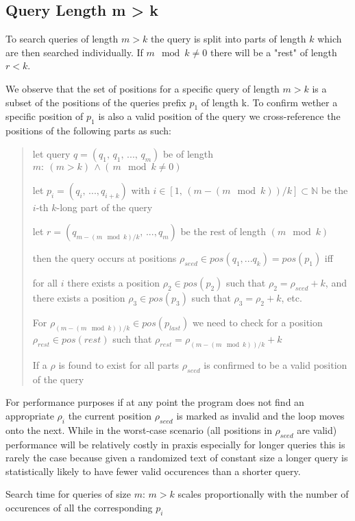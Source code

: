\subsection{Query Length m > k}
\label{m > k}

To search queries of length $m>k$ the query is split into parts of length $k$ which are then searched individually.
If $m\mod k\neq0$ there will be a "rest" of length $r<k$.

We observe that the set of positions for a specific query of length $m>k$ is a subset of the positions of the queries
prefix $p_{1}$ of length k. To confirm wether a specific position of $p_{1}$ is also a valid position of the query we
cross-reference the positions of the following parts as such:

\begin{verse}
let query $q=(q_{1},\,q_{1},\,...,\,q_{m})$ be of length $m:\:(m>k)\,\land(\,m\mod k\neq\text{0})$

let $p_{i}=(q_{i},\,...,q_{i+k})$ with $i\in[1,\,(m-(m\mod k))/k]\subset\mathbb{N}$
be the $i$-th $k$-long part of the query

let $r=(q_{m-(m\mod k)/k},\,...,q_{m})$ be the rest of length $(m\mod k)$

then the query occurs at positions $\rho_{seed}\in pos(q_{1},...q_{k})=pos(p_{1})$
iff

for all $i$ there exists a position $\rho_{2}\in pos(p_{2})$ such
that $\rho_{2}=\rho_{seed}+k$, and there exists a position $\rho_{3}\in pos(p_{3})$
such that $\rho_{3}=\rho_{2}+k$, etc.

For $\rho_{(m-(m\mod k))/k}\in pos(p_{last})$ we need to check for
a position $\rho_{rest}\in pos(rest)$ such that $\rho_{rest}=\rho_{(m-(m\mod k))/k}+k$

If a $\rho$ is found to exist for all parts $\rho_{seed}$ is confirmed to be a valid position of the query
\end{verse}

For performance purposes if at any point the program does not find an appropriate $\rho_{i}$ the current position
$\rho_{seed}$ is marked as invalid and the loop moves onto the next. While in the worst-case scenario (all positions
in $\rho_{seed}$ are valid) performance will be relatively costly in praxis especially for longer queries this is rarely the case
because given a randomized text of constant size a longer query is statistically likely to have fewer valid
occurences than a shorter query.

\begin{lem}
\label{Lemma 3}Search time for queries of size $m:\,m>k$ scales
proportionally with the number of occurences of all the corresponding $p_{i}$
\end{lem}

